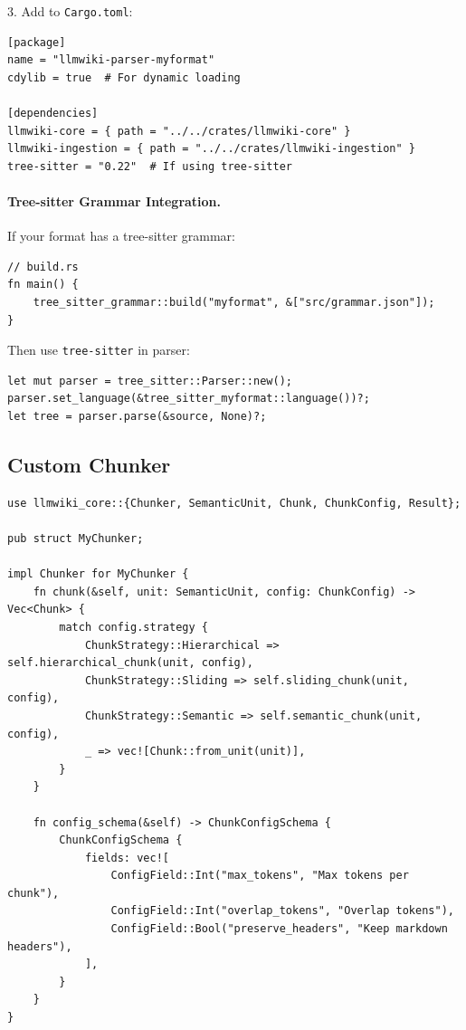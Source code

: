 3. Add to \texttt{Cargo.toml}:
\begin{verbatim}
[package]
name = "llmwiki-parser-myformat"
cdylib = true  # For dynamic loading

[dependencies]
llmwiki-core = { path = "../../crates/llmwiki-core" }
llmwiki-ingestion = { path = "../../crates/llmwiki-ingestion" }
tree-sitter = "0.22"  # If using tree-sitter
\end{verbatim}

\paragraph{Tree-sitter Grammar Integration.}
If your format has a tree-sitter grammar:
\begin{verbatim}
// build.rs
fn main() {
    tree_sitter_grammar::build("myformat", &["src/grammar.json"]);
}
\end{verbatim}

Then use \texttt{tree-sitter} in parser:
\begin{verbatim}
let mut parser = tree_sitter::Parser::new();
parser.set_language(&tree_sitter_myformat::language())?;
let tree = parser.parse(&source, None)?;
\end{verbatim}

\subsection{Custom Chunker}
\label{sec:dev:chunker}

\begin{verbatim}
use llmwiki_core::{Chunker, SemanticUnit, Chunk, ChunkConfig, Result};

pub struct MyChunker;

impl Chunker for MyChunker {
    fn chunk(&self, unit: SemanticUnit, config: ChunkConfig) -> Vec<Chunk> {
        match config.strategy {
            ChunkStrategy::Hierarchical => self.hierarchical_chunk(unit, config),
            ChunkStrategy::Sliding => self.sliding_chunk(unit, config),
            ChunkStrategy::Semantic => self.semantic_chunk(unit, config),
            _ => vec![Chunk::from_unit(unit)],
        }
    }

    fn config_schema(&self) -> ChunkConfigSchema {
        ChunkConfigSchema {
            fields: vec![
                ConfigField::Int("max_tokens", "Max tokens per chunk"),
                ConfigField::Int("overlap_tokens", "Overlap tokens"),
                ConfigField::Bool("preserve_headers", "Keep markdown headers"),
            ],
        }
    }
}
\end{verbatim}

